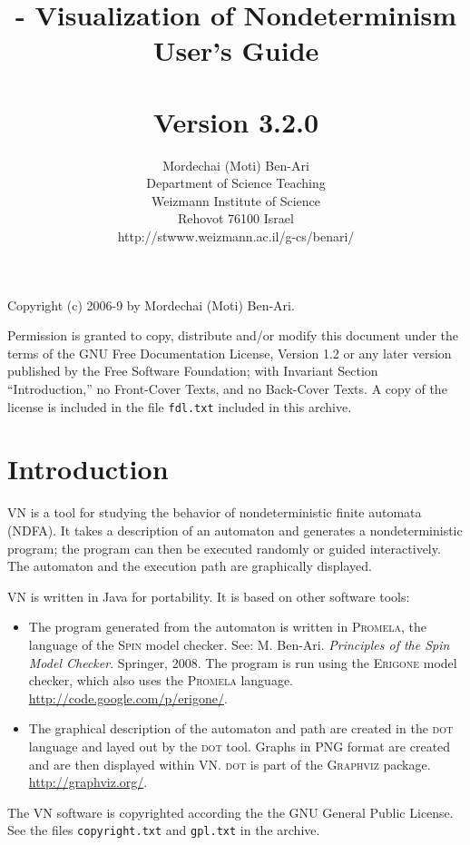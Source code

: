\documentclass[11pt]{article}
\title{\vn{} - Visualization of Nondeterminism\\
User's Guide\\\mbox{}\\\large{Version 3.2.0}}
\author{Mordechai (Moti) Ben-Ari\\
Department of Science Teaching\\
Weizmann Institute of Science\\
Rehovot 76100 Israel\\
\textsf{http://stwww.weizmann.ac.il/g-cs/benari/}}
\newcommand{\vn}{\textsc{VN}}
\newcommand{\dt}{\textsc{dot}}
\newcommand{\spn}{\textsc{Spin}}
\newcommand{\prm}{\textsc{Promela}}
\newcommand{\erg}{\textsc{Erigone}}
\newcommand{\p}[1]{\texttt{#1}}
\begin{document}
\maketitle
\thispagestyle{empty}

\vfil

\begin{center}
Copyright (c) 2006-9 by Mordechai (Moti) Ben-Ari.
\end{center}

Permission is granted to copy, distribute and/or modify this document
under the terms of the GNU Free Documentation License, Version 1.2 or
any later version published by the Free Software Foundation; with
Invariant Section ``Introduction,'' no Front-Cover Texts, and no
Back-Cover Texts. A copy of the license is included in the file
\p{fdl.txt} included in this archive.

\newpage

\section{Introduction}

\vn{} is a tool for studying the behavior of nondeterministic finite
automata (NDFA). It takes a description of an automaton and generates a
nondeterministic program; the program can then be executed randomly or
guided interactively. The automaton and the execution path are
graphically displayed.

\vn{} is written in Java for portability. It is based on other software
tools:

\begin{itemize}
\item The program generated from the automaton is written in \prm{}, the
language of the \spn{} model checker. See: M. Ben-Ari.
\textit{Principles of the Spin Model Checker}. Springer, 2008. The
program is run using the \erg{} model checker, which also uses the
\prm{} language. \url{http://code.google.com/p/erigone/}.

\item The graphical description of the automaton and path are created in
the \dt{} language and layed out by the \dt{} tool. Graphs in PNG format
are created and are then displayed within \vn{}. \dt{} is part of the
\textsc{Graphviz} package. \url{http://graphviz.org/}.
\end{itemize}

The \vn{} software is copyrighted according the the GNU General Public
License. See the files \p{copyright.txt} and \p{gpl.txt} in the archive.
\end{document}
